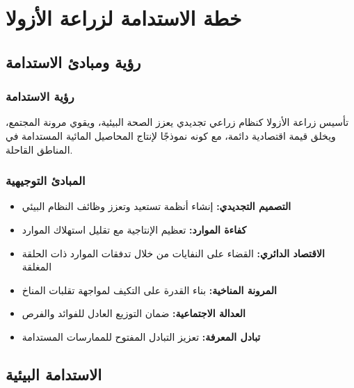 \section{خطة الاستدامة لزراعة الأزولا}

\subsection{رؤية ومبادئ الاستدامة}

\subsubsection{رؤية الاستدامة}
تأسيس زراعة الأزولا كنظام زراعي تجديدي يعزز الصحة البيئية، ويقوي مرونة المجتمع، ويخلق قيمة اقتصادية دائمة، مع كونه نموذجًا لإنتاج المحاصيل المائية المستدامة في المناطق القاحلة.

\subsubsection{المبادئ التوجيهية}
\begin{itemize}
    \item \textbf{التصميم التجديدي:} إنشاء أنظمة تستعيد وتعزز وظائف النظام البيئي
    \item \textbf{كفاءة الموارد:} تعظيم الإنتاجية مع تقليل استهلاك الموارد
    \item \textbf{الاقتصاد الدائري:} القضاء على النفايات من خلال تدفقات الموارد ذات الحلقة المغلقة
    \item \textbf{المرونة المناخية:} بناء القدرة على التكيف لمواجهة تقلبات المناخ
    \item \textbf{العدالة الاجتماعية:} ضمان التوزيع العادل للفوائد والفرص
    \item \textbf{تبادل المعرفة:} تعزيز التبادل المفتوح للممارسات المستدامة
\end{itemize}

\subsection{الاستدامة البيئية}

